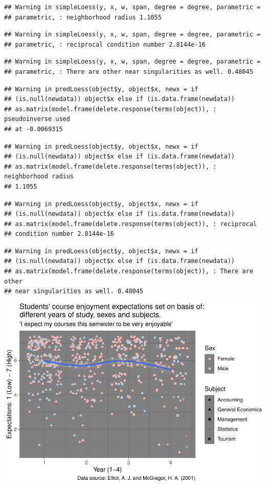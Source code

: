\documentclass[]{article}
\begin{document}
\begin{verbatim}
## Warning in simpleLoess(y, x, w, span, degree = degree, parametric =
## parametric, : neighborhood radius 1.1055
\end{verbatim}

\begin{verbatim}
## Warning in simpleLoess(y, x, w, span, degree = degree, parametric =
## parametric, : reciprocal condition number 2.8144e-16
\end{verbatim}

\begin{verbatim}
## Warning in simpleLoess(y, x, w, span, degree = degree, parametric =
## parametric, : There are other near singularities as well. 0.48045
\end{verbatim}

\begin{verbatim}
## Warning in predLoess(object$y, object$x, newx = if
## (is.null(newdata)) object$x else if (is.data.frame(newdata))
## as.matrix(model.frame(delete.response(terms(object)), : pseudoinverse used
## at -0.0069315
\end{verbatim}

\begin{verbatim}
## Warning in predLoess(object$y, object$x, newx = if
## (is.null(newdata)) object$x else if (is.data.frame(newdata))
## as.matrix(model.frame(delete.response(terms(object)), : neighborhood radius
## 1.1055
\end{verbatim}

\begin{verbatim}
## Warning in predLoess(object$y, object$x, newx = if
## (is.null(newdata)) object$x else if (is.data.frame(newdata))
## as.matrix(model.frame(delete.response(terms(object)), : reciprocal
## condition number 2.8144e-16
\end{verbatim}

\begin{verbatim}
## Warning in predLoess(object$y, object$x, newx = if
## (is.null(newdata)) object$x else if (is.data.frame(newdata))
## as.matrix(model.frame(delete.response(terms(object)), : There are other
## near singularities as well. 0.48045
\end{verbatim}

\includegraphics{StudentGoals_files/figure-latex/unnamed-chunk-18-1.pdf}
\end{document}

